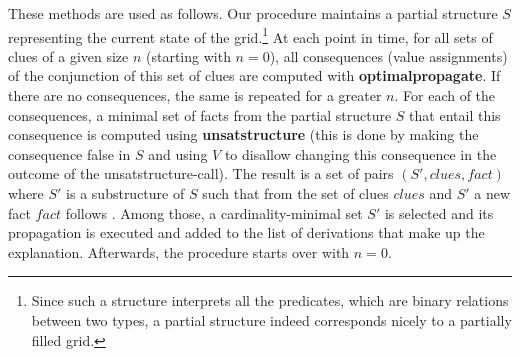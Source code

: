 These methods are used as follows. Our procedure maintains a partial structure $S$ representing the current state of the grid.\footnote{Since such a structure interprets all the predicates, which are binary relations between two types, a partial structure indeed corresponds nicely to a partially filled grid.} 
At each point in time, for all sets of clues of a given size $n$ (starting with $n=0$), all consequences (value assignments) of the conjunction of this set of clues are computed with \textbf{optimalpropagate}. 
If there are no consequences, the same is repeated for a greater $n$. 
For each of the consequences, a minimal set of facts from the partial structure $S$ that entail this consequence is computed using \textbf{unsatstructure} (this is done by making the consequence false in $S$ and using $V$ to disallow changing this consequence in the outcome of the unsatstructure-call). 
The result is a set of pairs $(S',\mathit{clues},\mathit{fact})$ where $S'$ is a substructure of $S$ such that from the set of clues $\mathit{clues}$ and $S'$ a new fact $\mathit{fact}$ follows   . Among those, a cardinality-minimal set $S'$ is selected and its propagation is executed and added to the list of derivations that make up the explanation.
Afterwards, the procedure starts over with $n=0$. 


